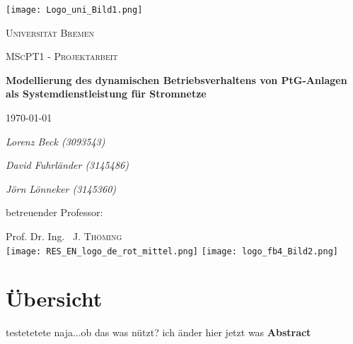 \documentclass[onecolumn,10pt,titlepage]{article}
\begin{document}
\begin{titlepage}
	\centering
	
	{\texttt{[image: Logo\_uni\_Bild1.png]}\par}
	\vspace{1cm}
	{\scshape\Large Universität Bremen \par}
	\vspace{1cm}
	{\scshape\LARGE MScPT1 - Projektarbeit \par}
	\vspace{1.5cm}
	{\huge\bfseries Modellierung des dynamischen Betriebsverhaltens von PtG-Anlagen als Systemdienstleistung für Stromnetze\par}
	\vspace{2cm}
    {\large \today\par}
    \vspace{2cm}
	{\Large\itshape Lorenz Beck (3093543)\par}
    \vspace{0.3cm}
    {\Large\itshape David Fuhrländer (3145486)\par}
    \vspace{0.3cm}
    {\Large\itshape Jörn Lönneker (3145360)\par}
	\vfill
	betreuender Professor:\par
	Prof. Dr. Ing. ~J. \textsc{Thöming}\\

    \vfill
   	\texttt{[image: RES\_EN\_logo\_de\_rot\_mittel.png]}
	\hfill	
	\texttt{[image: logo\_fb4\_Bild2.png]}%

	
\end{titlepage}

\onehalfspace

\section*{Übersicht}
testetetete
naja...ob das was nützt?
ich änder hier jetzt was
{\textbf{Abstract}}\par
\end{document}
